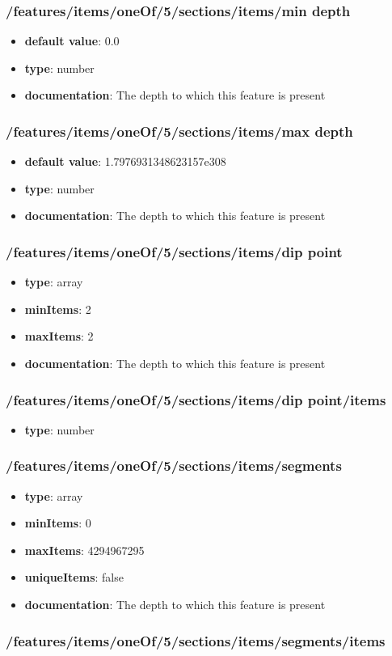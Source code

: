 \subsubsection{/features/items/oneOf/5/sections/items/min depth}
\begin{itemize}\item {\bf default value}: 0.0
\item {\bf type}: number
\item {\bf documentation}: The depth to which this feature is present
\end{itemize}\subsubsection{/features/items/oneOf/5/sections/items/max depth}
\begin{itemize}\item {\bf default value}: 1.7976931348623157e308
\item {\bf type}: number
\item {\bf documentation}: The depth to which this feature is present
\end{itemize}\subsubsection{/features/items/oneOf/5/sections/items/dip point}
\begin{itemize}\item {\bf type}: array
\item {\bf minItems}: 2
\item {\bf maxItems}: 2
\item {\bf documentation}: The depth to which this feature is present
\end{itemize}\subsubsection{/features/items/oneOf/5/sections/items/dip point/items}
\begin{itemize}\item {\bf type}: number
\end{itemize}\subsubsection{/features/items/oneOf/5/sections/items/segments}
\begin{itemize}\item {\bf type}: array
\item {\bf minItems}: 0
\item {\bf maxItems}: 4294967295
\item {\bf uniqueItems}: false
\item {\bf documentation}: The depth to which this feature is present
\end{itemize}\subsubsection{/features/items/oneOf/5/sections/items/segments/items}
